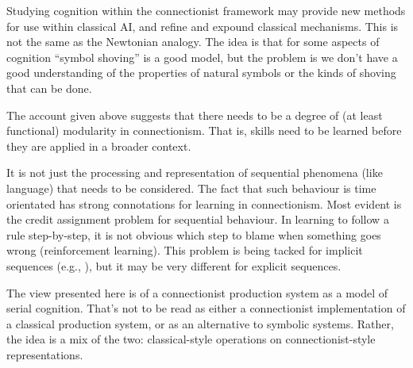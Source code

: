  Studying cognition within the
connectionist framework may provide new methods for use within
classical AI, and refine and expound classical mechanisms.  This is
not the same as the Newtonian
analogy.  The idea is that for some aspects of
cognition ``symbol shoving'' is a good model, but the problem is we
don't have a good understanding of the properties of natural symbols
or the kinds of shoving that can be done.

 The account given above suggests that there
needs to be a degree of (at least functional) modularity in
connectionism.  That is, skills need to be learned before they are
applied in a broader context.

 It is not just the processing and
representation of sequential phenomena (like language) that needs to
be considered.  The
fact that such behaviour is time orientated has strong connotations
for learning in connectionism.  Most evident is
the credit assignment problem for sequential behaviour. In learning
to follow a rule step-by-step, it is not obvious which step to blame
when something goes wrong (reinforcement learning). This problem is
being tacked for implicit sequences (e.g., ), but it
may be very different for explicit sequences.
\medskip

The view presented here is of a connectionist production system as a
model of serial cognition.  That's not to be read as either a
connectionist implementation of a classical production system, or as
an alternative to symbolic systems.  Rather, the idea is a mix of the
two: classical-style operations on connectionist-style
representations.



